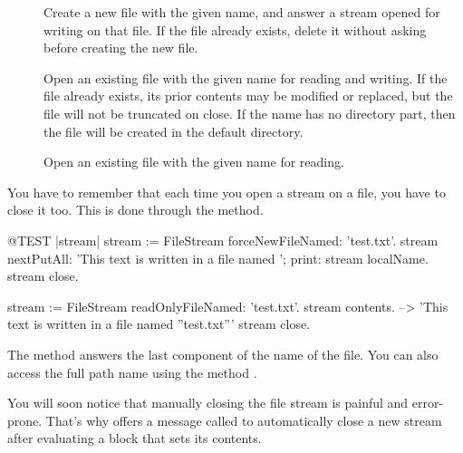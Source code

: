 \documentclass[a4paper,10pt,twoside]{book}
\begin{document}
{\begin{description}
\item[] Create a new file with the given
  name, and answer a stream opened for writing on that file. If the
  file already exists, delete it without asking before creating the
  new file.

\item[] Open an existing file with the given
  name for reading and writing. If the file already exists, its prior
  contents may be modified or replaced, but the file will not be
  truncated on close. If the name has no directory part, then the file
  will be created in the default directory.

\item[] Open an existing file with the
  given name for reading.

\end{description}

You have to remember that each time you open a stream on a file, you
have to close it too. This is done through the  method.

\begin{code}{@TEST |stream|}
stream := FileStream forceNewFileNamed: 'test.txt'.
stream
    nextPutAll: 'This text is written in a file named ';
    print: stream localName.
stream close.

stream := FileStream readOnlyFileNamed: 'test.txt'.
stream contents. --> 'This text is written in a file named ''test.txt'''
stream close.
\end{code}



The method  answers the last component of the name of the file. You can
also access the full path name using the method
.

You will soon notice that manually closing the file stream is
painful and error-prone. That's why  offers a message called  to
automatically close a new stream after evaluating a block that
sets its contents.

}
\end{document}

